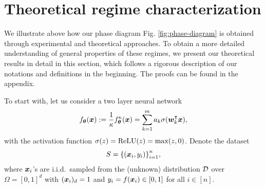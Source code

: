 \documentclass{article}
\begin{document}
\section{Theoretical regime characterization}\label{sec..Theorem}
We illustrate above how our phase diagram Fig. \ref{fig:phase-diagram} is obtained through experimental and theoretical approaches. To obtain a more detailed understanding of general properties of these regimes, we present our theoretical results in detail in this section, which follows a rigorous description of our notations and definitions in the beginning. The proofs can be found in the appendix.

To start with, let us consider a two layer neural network
\begin{equation}
    f_{\bm{\theta}}(\bm{x}) := \frac{1}{\kappa}f^\kappa_{\bm{\theta}}(\bm{x}) = \sum_{k=1}^{m} a_k\sigma(\bm{w}_k^\intercal\bm{x}),
\end{equation}
with the activation function $\sigma(z) = \mathrm{ReLU}(z) = \max(z, 0)$. Denote the dataset
\begin{equation}
    S = {\{(\bm{x}_i, y_i)\}}_{i=1}^n,
\end{equation}
where $\bm{x}_i$'s are i.i.d.\ sampled from the (unknown) distribution $\mathcal{D}$ over $\Omega={[0,1]}^d$ with $(\bm{x}_i)_d=1$ and $y_i=f(\bm{x}_i)\in[0,1]$ for all $i\in[n]$.
\end{document}
